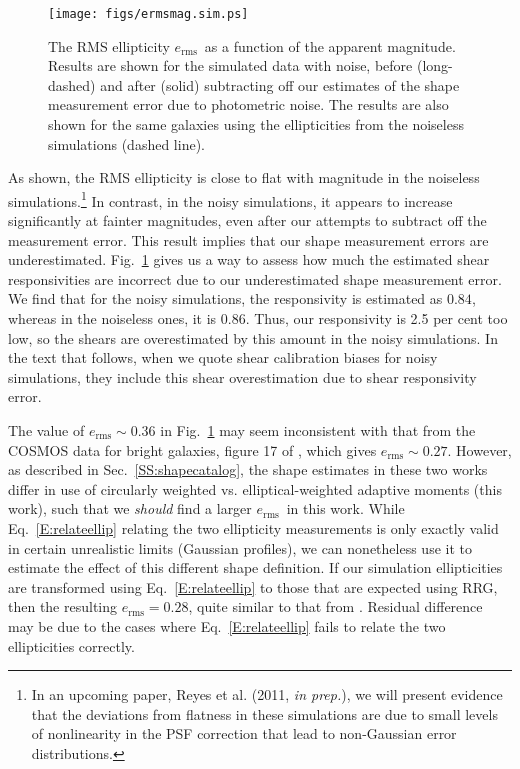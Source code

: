 \documentclass[twocolumn,useAMS,usenatbib]{mn2e}
\newcommand{\erms}{\ensuremath{e_\mathrm{rms}}}
\newcommand{\newtext}{}
\begin{document}
\begin{figure}
\begin{center}
\texttt{[image: figs/ermsmag.sim.ps]}
\caption{\label{F:ermsmag} The RMS ellipticity \erms\ as a function of
  the apparent magnitude.  Results are shown for the simulated data
  with noise, before (long-dashed) and after (solid) subtracting off our estimates of the
  shape measurement error due to photometric noise.  The results are
  also shown for the same galaxies using the ellipticities from the
  noiseless simulations (dashed line).} 
\end{center}
\end{figure}
As shown, the RMS ellipticity is close to flat with magnitude in the
noiseless simulations.\footnote{In an upcoming paper, Reyes et
  al. (2011, {\em in prep.}), we will present evidence that the
  deviations from flatness in these simulations are due to small
  levels of nonlinearity in the PSF correction that lead to
  non-Gaussian error distributions.}  In contrast, in the noisy
simulations, it appears to increase significantly at fainter
magnitudes, even after our attempts to subtract off the measurement
error.  This result implies that our shape measurement errors are
underestimated.  %
Fig.~\ref{F:ermsmag} gives us a way to assess how much the
estimated shear responsivities are incorrect due to our underestimated
shape measurement error.  We find that for the noisy simulations, the
responsivity is estimated as $0.84$, whereas in the noiseless ones, it
is $0.86$.  Thus, our responsivity is 2.5 per cent too low, so the
shears are overestimated by this amount in the noisy simulations.  In
the text that follows, when we quote shear calibration biases for
noisy simulations, they
include this shear overestimation due to shear responsivity error.

\newtext{The value of $\erms\sim 0.36$ in Fig.~\ref{F:ermsmag} may
  seem  inconsistent with that from the COSMOS data for bright
  galaxies, figure 17 of \citet{2007ApJS..172..219L}, which gives
  $\erms\sim 0.27$.  However, as described in
  Sec.~\ref{SS:shapecatalog}, the shape estimates in these two works
  differ in use of circularly weighted \citep{2007ApJS..172..219L}
  vs. elliptical-weighted adaptive moments (this work), such that we {\em should} find a larger \erms\ in
  this work.  While Eq.~\eqref{E:relateellip} relating
  the two ellipticity measurements is only exactly valid in certain
  unrealistic limits (Gaussian profiles), we can nonetheless use it to
  estimate the effect of this different shape definition.  If our 
  simulation ellipticities are transformed using
  Eq.~\eqref{E:relateellip} to those that are expected using RRG, then
  the resulting $\erms=0.28$, quite similar to that from
  \citet{2007ApJS..172..219L}.  Residual difference may be due
  to the cases where Eq.~\eqref{E:relateellip} fails to relate the two
  ellipticities correctly. 
} 
\end{document}

